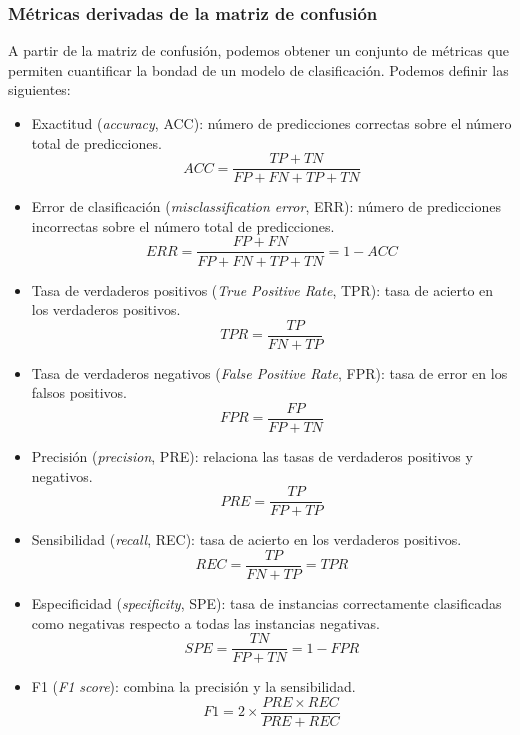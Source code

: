 \subsubsection{Métricas derivadas de la matriz de confusión}
A partir de la matriz de confusión, podemos obtener un conjunto de métricas que permiten cuantificar la bondad de un modelo de clasificación.
Podemos definir las siguientes:
\begin{itemize}
    \item Exactitud (\textit{accuracy}, ACC): número de predicciones correctas sobre el número total de predicciones.
    \begin{equation}
    ACC=\frac{TP+TN}{FP+FN+TP+TN}
    \end{equation}
    \item Error de clasificación (\textit{misclassification error}, ERR): número de predicciones incorrectas sobre el número total de predicciones.
    \begin{equation}
    ERR=\frac{FP+FN}{FP+FN+TP+TN}=1-ACC
    \end{equation}
    \item Tasa de verdaderos positivos (\textit{True Positive Rate}, TPR): tasa de acierto en los verdaderos positivos.
    \begin{equation}
    TPR=\frac{TP}{FN+TP}
    \end{equation} 
    \item Tasa de verdaderos negativos (\textit{False Positive Rate}, FPR): tasa de error en los falsos positivos.
    \begin{equation}
    FPR=\frac{FP}{FP+TN}
    \end{equation}
    \item Precisión (\textit{precision}, PRE): relaciona las tasas de verdaderos positivos y negativos.
    \begin{equation}
    PRE=\frac{TP}{FP+TP}
    \end{equation}
    \item Sensibilidad (\textit{recall}, REC): tasa de acierto en los verdaderos positivos.
       \begin{equation}
    REC=\frac{TP}{FN+TP}=TPR
    \end{equation}
    \item Especificidad (\textit{specificity}, SPE): tasa de instancias correctamente clasificadas como negativas respecto a todas las instancias negativas.
    \begin{equation}
    SPE=\frac{TN}{FP+TN}=1-FPR
    \end{equation}
    \item F1 (\textit{F1 score}): combina la precisión y la sensibilidad.
    \begin{equation}
    F1=2\times\frac{PRE \times REC}{PRE+REC}
    \end{equation} 
    
\end{itemize}

